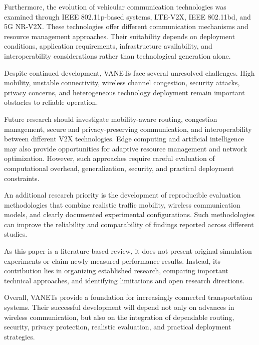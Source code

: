 Furthermore, the evolution of vehicular
communication technologies was examined
through IEEE 802.11p-based systems,
LTE-V2X, IEEE 802.11bd, and 5G NR-V2X.
These technologies offer different
communication mechanisms and resource
management approaches. Their suitability
depends on deployment conditions,
application requirements, infrastructure
availability, and interoperability
considerations rather than technological
generation alone.

Despite continued development, VANETs
face several unresolved challenges.
High mobility, unstable connectivity,
wireless channel congestion, security
attacks, privacy concerns, and
heterogeneous technology deployment
remain important obstacles to
reliable operation.

Future research should investigate
mobility-aware routing, congestion
management, secure and privacy-preserving
communication, and interoperability
between different V2X technologies.
Edge computing and artificial
intelligence may also provide
opportunities for adaptive resource
management and network optimization.
However, such approaches require
careful evaluation of computational
overhead, generalization, security,
and practical deployment constraints.

An additional research priority is
the development of reproducible
evaluation methodologies that combine
realistic traffic mobility,
wireless communication models,
and clearly documented experimental
configurations. Such methodologies
can improve the reliability and
comparability of findings reported
across different studies.

As this paper is a literature-based
review, it does not present original
simulation experiments or claim
newly measured performance results.
Instead, its contribution lies in
organizing established research,
comparing important technical
approaches, and identifying
limitations and open research
directions.

Overall, VANETs provide a foundation
for increasingly connected
transportation systems. Their
successful development will depend
not only on advances in wireless
communication, but also on the
integration of dependable routing,
security, privacy protection,
realistic evaluation, and
practical deployment strategies.
